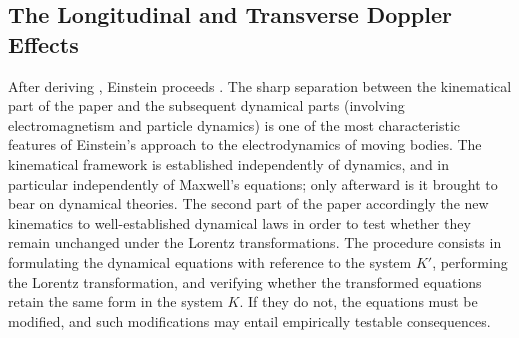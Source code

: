 \documentclass[pdflatex,sn-basic]{sn-jnl}
\begin{document}



\subsection{The Longitudinal and Transverse Doppler Effects}
%
After deriving , Einstein proceeds  \citep[907]{Einstein1905}. The sharp separation between the kinematical part of the paper and the subsequent dynamical parts (involving electromagnetism and particle dynamics) is one of the most characteristic features of Einstein’s approach to the electrodynamics of moving bodies. The kinematical framework is established independently of dynamics, and in particular independently of Maxwell’s equations; only afterward is it brought to bear on dynamical theories. The second part of the paper accordingly  the new kinematics to well-established dynamical laws in order to test whether they remain unchanged under the Lorentz transformations. The procedure consists in formulating the dynamical equations with reference to the  system $K'$, performing the Lorentz transformation, and verifying whether the transformed equations retain the same form in the  system $K$. If they do not, the equations must be modified, and such modifications may entail empirically testable consequences.

\end{document}
